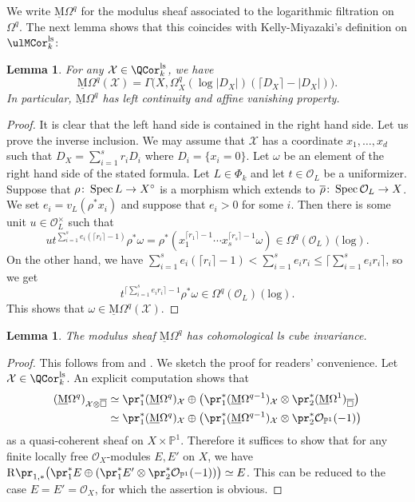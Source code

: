 \documentclass{amsart}
\theoremstyle{plain}
\newtheorem{lemma}[theorem]{Lemma}
\theoremstyle{definition}
\theoremstyle{remark}
\numberwithin{equation}{section}
\newcommand{\bcube}{{\overline{\square}}}
\def\ceil#1{\lceil #1 \rceil}
\def\ls{\mathrm{ls}}
\def\MOmega{\underline{\mathrm{M}}\Omega}
\def\logrm{\mathrm{log}}
\begin{document}
We write $\MOmega^q$ for the modulus sheaf associated to the logarithmic filtration on $\Omega^q$.
The next lemma shows that this coincides with Kelly-Miyazaki's definition on $\ulMCor_k^\ls$:

\begin{lemma}\label{omega_log_formula}
	For any $\mathcal{X}\in \QCor_k^\ls$, we have
	$$
		\MOmega^q(\mathcal{X})=\Gamma\bigl(X,\Omega^q_X(\log |D_X|)(\ceil{D_X}-|D_X|)\bigr).
	$$
	In particular, $\MOmega^q$ has left continuity and affine vanishing property.
\end{lemma}

\begin{proof}
	It is clear that the left hand side is contained in the right hand side.
	Let us prove the inverse inclusion.
	We may assume that $\mathcal{X}$ has a coordinate $x_1,\dots,x_d$ such that $D_X=\sum_{i=1}^s r_i D_i$ where $D_i=\{x_i=0\}$.
	Let $\omega$ be an element of the right hand side of the stated formula.
	Let $L\in \Phi_k$ and let $t\in \mathcal{O}_L$ be a uniformizer.
	Suppose that $\rho\colon \operatorname{Spec} L\to X^\circ$ is a morphism which extends to $\overline{\rho}\colon \operatorname{Spec} \mathcal{O}_L\to X$.
	We set $e_i=v_L(\rho^*x_i)$ and suppose that $e_i>0$ for some $i$.
	Then there is some unit $u\in \mathcal{O}_L^\times$ such that
	$$
		u t^{\sum_{i=1}^s e_i(\ceil{r_i}-1)}\rho^*\omega = \rho^*(x_1^{\ceil{r_1}-1}\cdots x_s^{\ceil{r_s}-1}\omega)\in \Omega^q(\mathcal{O}_L)(\logrm).
	$$
	On the other hand, we have $\sum_{i=1}^s e_i(\ceil{r_i}-1)<\sum_{i=1}^s e_i r_i\leq \ceil{\sum_{i=1}^s e_i r_i}$, so we get
	$$
		t^{\ceil{\sum_{i=1}^s e_i r_i}-1}\rho^*\omega\in \Omega^q(\mathcal{O}_L)(\logrm).
	$$
	This shows that $\omega\in \MOmega^q(\mathcal{X})$.
\end{proof}

\begin{lemma}\label{omega_CCI}
	The modulus sheaf $\MOmega^q$ has cohomological ls cube invariance.
\end{lemma}

\begin{proof}
	This follows from  and \cite[Corollary 5.2]{KellyMiyazaki_Hodge2}.
	We sketch the proof for readers' convenience.
	Let $\mathcal{X}\in \QCor_k^\ls$.
	An explicit computation shows that 
	\begin{align*}
		(\MOmega^q)_{\mathcal{X}\otimes\bcube}&{}\simeq \pr_1^*(\MOmega^q)_\mathcal{X}\oplus\bigl(\pr_1^*(\MOmega^{q-1})_\mathcal{X}\otimes\pr_2^*(\MOmega^1)_\bcube\bigr)\\
		&{}\simeq \pr_1^*(\MOmega^q)_\mathcal{X}\oplus\bigl(\pr_1^*(\MOmega^{q-1})_\mathcal{X}\otimes\pr_2^*\mathcal{O}_{\mathbb{P}^1}(-1)\bigr)
	\end{align*}
	as a quasi-coherent sheaf on $X\times\mathbb{P}^1$.
	Therefore it suffices to show that for any finite locally free $\mathcal{O}_X$-modules $E,E'$ on $X$, we have $\mathrm{R}\pr_{1,*}\bigl(\pr_1^*E\oplus(\pr_1^*E'\otimes \pr_2^*\mathcal{O}_{\mathbb{P}^1}(-1))\bigr)\simeq E$.
	This can be reduced to the case $E=E'=\mathcal{O}_X$, for which the assertion is obvious.
\end{proof}
\end{document}
